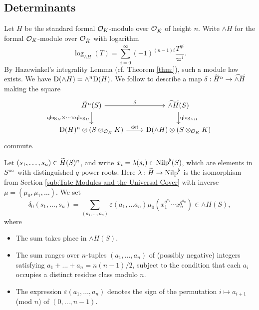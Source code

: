 \documentclass[../main.tex]{subfiles}
\begin{document}
\subsection{Determinants } %
\label{sub:Determinants}
Let $H$ be the standard formal $\cO_K$-module over $\cO_{\breve K}$ of height
$n$. Write $\wedge H$ for the formal $\cO_K$-module over $\cO_{\breve K}$ with
logarithm
\begin{equation*}
  \log_{\wedge H}(T) = \sum_{i = 0}^\infty (-1)^{(n-1)i} \frac{T^{qi}}{\varpi^i}.
\end{equation*}
By Hazewinkel's integrality Lemma (cf. Theorem \ref{thm:}), 
such a module law exists. We have $\Dio(\wedge H) = \wedge^n \Dio(H)$. 
We follow \cite[Theorem 2.10.3]{BoyarchenkoWeinstein2011MaxVar} to describe a map $\delta:
\Tilde H^n \to \Tilde {\wedge H}$ making the square
\begin{equation}\label{diag:qlogsquare}
\begin{tikzcd}[ampersand replacement=\&]
	{\Tilde H^n(S)} \& {\Tilde{\wedge H}(S)} \\
	{\Dio(H)^n \otimes (S\otimes_{\cO_K} K)} \& {\Dio(\wedge H) \otimes(S\otimes_{\cO_K}K)}
	\arrow["\delta", from=1-1, to=1-2]
	\arrow["\qlog_H \times \dots \times \qlog_H"', from=1-1, to=2-1]
  \arrow["\qlog_{\wedge H}", from=1-2, to=2-2]
	\arrow["\det", from=2-1, to=2-2]
\end{tikzcd}
\end{equation}
commute. 

Let $(s_1, \dots, s_n) \in \Tilde H(S)^n$, and write $x_i = \lambda(s_i) \in
\Nilp^\flat(S)$, which are elements in $S^\cici$ with distinguished $q$-power
roots. Here $\lambda: \Tilde H \to \Nilp^\flat$ is the isomorphism from Section
\ref{sub:Tate Modules and the Universal Cover} with inverse $\mu = (\mu_0, \mu_1, \dots)$. 
We set
\begin{equation*}
  \delta_0(s_1, \dots, s_n) = \sum_{(a_1, \dots, a_n)} \varepsilon(a_1, \dots
  a_n) \mu_0(x_1^{q^{a_1}} \cdots x_n^{q^{a_n}}) \in \wedge H(S),
\end{equation*}
where 
\begin{itemize}
  \item The sum takes place in ${\wedge H}(S)$.
  \item The sum ranges over $n$-tuples $(a_1, \dots, a_n)$ of (possibly negative) integers 
    satisfying $a_1 + \dots + a_n = n (n-1)/2$, subject to the
    condition that each $a_i$ occupies a distinct residue class modulo $n$.
  \item The expression $\varepsilon(a_1, \dots, a_n)$ denotes the sign of the 
    permutation $i \mapsto a_{i+1}$ (mod $n$) of $(0, \dots, n-1)$.
\end{itemize}
\end{document}
